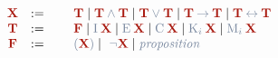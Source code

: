 \documentclass{article}
\newcommand{\non}[1]{\textcolor{nonterminal}{#1}}
\newcommand{\ter}[1]{\textcolor{terminal}{#1}}
\newcommand{\terun}[1]{\mathord{\ter{#1}}}
\newcommand{\terbin}[1]{\mathbin{\ter{#1}}}
\newcommand{\teropen}[1]{\mathopen{\ter{#1}}}
\newcommand{\terclose}[1]{\mathclose{\ter{#1}}}
\newcommand{\prop}{\ter{\mathit{proposition}}}
\newcommand{\x}{\non{\ensuremath{{\mathbf{X}}}}}
\renewcommand{\t}{\non{\ensuremath{{\mathbf{T}}}}}
\newcommand{\f}{\non{\ensuremath{{\mathbf{F}}}}}
\begin{document}
{\fontsize{50}{60}\selectfont 
$	\begin{array}{cccl} 
	\x & := & ~ & 
		\t 								\; | \; 
		\t \terbin{\land} \t 			\; | \; 
		\t \terbin{\lor} \t 			\; | \; 
		\t \terbin{\to} \t 				\; | \; 
		\t \terbin{\leftrightarrow} \t 	\\ 
	\t & := & ~ & 
		\f 										\; | \;
		\terun{\text{I}}\: \x 					\; | \; 
		\terun{\text{E}}\: \x 					\; | \; 
		\terun{\text{C}}\: \x 					\; | \; 
		\terun{\text{K}_i}\: \x 				\; | \; 
		\terun{\text{M}_i}\: \x 				\\ 
	\f & := & ~ & 
		\teropen{(} \x \terclose{)} 				\; | \; 
		~ \terun{\lnot} \x 						\; | \; 
		\prop 					\\ 
	\end{array}$
}
\end{document}
